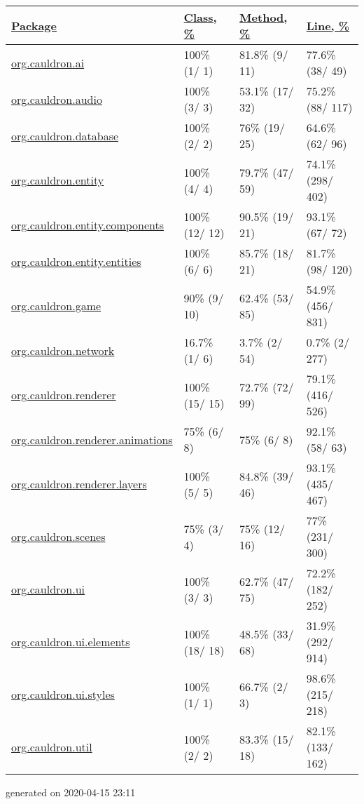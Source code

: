\documentclass[
]{article}
\begin{document}
\begin{longtable}[]{@{}llll@{}}
\toprule
\href{index_SORT_BY_NAME_DESC.html}{Package} &
\href{index_SORT_BY_CLASS.html}{Class, \%} &
\href{index_SORT_BY_METHOD.html}{Method, \%} &
\href{index_SORT_BY_LINE.html}{Line, \%}\tabularnewline
\midrule
\endhead
\href{org.cauldron.ai/index.html}{org.cauldron.ai} & { 100\% } { (1/ 1)
} & { 81.8\% } { (9/ 11) } & { 77.6\% } { (38/ 49) }\tabularnewline
\href{org.cauldron.audio/index.html}{org.cauldron.audio} & { 100\% } {
(3/ 3) } & { 53.1\% } { (17/ 32) } & { 75.2\% } { (88/ 117)
}\tabularnewline
\href{org.cauldron.database/index.html}{org.cauldron.database} & { 100\%
} { (2/ 2) } & { 76\% } { (19/ 25) } & { 64.6\% } { (62/ 96)
}\tabularnewline
\href{org.cauldron.entity/index.html}{org.cauldron.entity} & { 100\% } {
(4/ 4) } & { 79.7\% } { (47/ 59) } & { 74.1\% } { (298/ 402)
}\tabularnewline
\href{org.cauldron.entity.components/index.html}{org.cauldron.entity.components}
& { 100\% } { (12/ 12) } & { 90.5\% } { (19/ 21) } & { 93.1\% } { (67/
72) }\tabularnewline
\href{org.cauldron.entity.entities/index.html}{org.cauldron.entity.entities}
& { 100\% } { (6/ 6) } & { 85.7\% } { (18/ 21) } & { 81.7\% } { (98/
120) }\tabularnewline
\href{org.cauldron.game/index.html}{org.cauldron.game} & { 90\% } { (9/
10) } & { 62.4\% } { (53/ 85) } & { 54.9\% } { (456/ 831)
}\tabularnewline
\href{org.cauldron.network/index.html}{org.cauldron.network} & { 16.7\%
} { (1/ 6) } & { 3.7\% } { (2/ 54) } & { 0.7\% } { (2/ 277)
}\tabularnewline
\href{org.cauldron.renderer/index.html}{org.cauldron.renderer} & { 100\%
} { (15/ 15) } & { 72.7\% } { (72/ 99) } & { 79.1\% } { (416/ 526)
}\tabularnewline
\href{org.cauldron.renderer.animations/index.html}{org.cauldron.renderer.animations}
& { 75\% } { (6/ 8) } & { 75\% } { (6/ 8) } & { 92.1\% } { (58/ 63)
}\tabularnewline
\href{org.cauldron.renderer.layers/index.html}{org.cauldron.renderer.layers}
& { 100\% } { (5/ 5) } & { 84.8\% } { (39/ 46) } & { 93.1\% } { (435/
467) }\tabularnewline
\href{org.cauldron.scenes/index.html}{org.cauldron.scenes} & { 75\% } {
(3/ 4) } & { 75\% } { (12/ 16) } & { 77\% } { (231/ 300)
}\tabularnewline
\href{org.cauldron.ui/index.html}{org.cauldron.ui} & { 100\% } { (3/ 3)
} & { 62.7\% } { (47/ 75) } & { 72.2\% } { (182/ 252) }\tabularnewline
\href{org.cauldron.ui.elements/index.html}{org.cauldron.ui.elements} & {
100\% } { (18/ 18) } & { 48.5\% } { (33/ 68) } & { 31.9\% } { (292/ 914)
}\tabularnewline
\href{org.cauldron.ui.styles/index.html}{org.cauldron.ui.styles} & {
100\% } { (1/ 1) } & { 66.7\% } { (2/ 3) } & { 98.6\% } { (215/ 218)
}\tabularnewline
\href{org.cauldron.util/index.html}{org.cauldron.util} & { 100\% } { (2/
2) } & { 83.3\% } { (15/ 18) } & { 82.1\% } { (133/ 162)
}\tabularnewline
\bottomrule
\end{longtable}

generated on 2020-04-15 23:11
\end{document}
